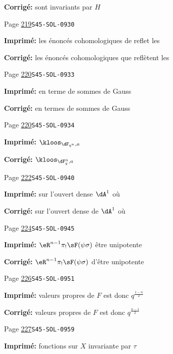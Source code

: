 \begin{description}
\par\noindent\textbf{Corrigé:} sont invariants par $H$
\smallskip
\item[\hypertarget{apparatus:FR-0232}{232}] Page \hyperlink{printpage:fr:219}{219}\quad\texttt{S45-SOL-0930}
\par\noindent\textbf{Imprimé:} les énoncés cohomologiques de reflet les
\par\noindent\textbf{Corrigé:} les énoncés cohomologiques que reflètent les
\smallskip
\item[\hypertarget{apparatus:FR-0233}{233}] Page \hyperlink{printpage:fr:220}{220}\quad\texttt{S45-SOL-0933}
\par\noindent\textbf{Imprimé:} en terme de sommes de Gauss
\par\noindent\textbf{Corrigé:} en termes de sommes de Gauss
\smallskip
\item[\hypertarget{apparatus:FR-0234}{234}] Page \hyperlink{printpage:fr:220}{220}\quad\texttt{S45-SOL-0934}
\par\noindent\textbf{Imprimé:} \(\kloos_{\dF_{q^n},a}\)
\par\noindent\textbf{Corrigé:} \(\kloos_{\dF_q^n,a}\)
\smallskip
\item[\hypertarget{apparatus:FR-0235}{235}] Page \hyperlink{printpage:fr:222}{222}\quad\texttt{S45-SOL-0940}
\par\noindent\textbf{Imprimé:} sur l'ouvert dense $\dA^1$ où
\par\noindent\textbf{Corrigé:} sur l'ouvert dense de $\dA^1$ où
\smallskip
\item[\hypertarget{apparatus:FR-0236}{236}] Page \hyperlink{printpage:fr:224}{224}\quad\texttt{S45-SOL-0945}
\par\noindent\textbf{Imprimé:} $\eR^{n-1} \pi_! \sF(\psi\sigma)$ être unipotente
\par\noindent\textbf{Corrigé:} $\eR^{n-1} \pi_! \sF(\psi\sigma)$ d'être unipotente
\smallskip
\item[\hypertarget{apparatus:FR-0237}{237}] Page \hyperlink{printpage:fr:226}{226}\quad\texttt{S45-SOL-0951}
\par\noindent\textbf{Imprimé:} valeurs propres de $F$ est donc $q^{\frac{1-n}{2}}$
\par\noindent\textbf{Corrigé:} valeurs propres de $F$ est donc $q^{\frac{n-1}{2}}$
\smallskip
\item[\hypertarget{apparatus:FR-0238}{238}] Page \hyperlink{printpage:fr:227}{227}\quad\texttt{S45-SOL-0959}
\par\noindent\textbf{Imprimé:} fonctions sur $X$ invariante par $\tau$

\end{description}
